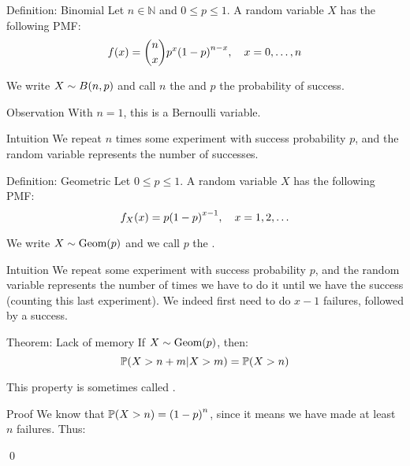 \documentclass[a4paper]{article}
\begin{document}
\begin{parag}{Definition: Binomial}
    Let $n \in \mathbb{N}$ and $0 \leq p \leq 1$. A  random variable $X$ has the following PMF: 
    \[f\left(x\right) = \binom{n}{x} p^x \left(1 - p\right)^{n-x}, \mathspace x = 0, \ldots, n\]
    
    We write $X \followsdistr B\left(n, p\right)$ and call $n$ the  and $p$ the probability of success.

    \begin{subparag}{Observation}
        With $n=1$, this is a Bernoulli variable.
    \end{subparag}

    \begin{subparag}{Intuition}
        We repeat $n$ times some experiment with success probability $p$, and the random variable represents the number of successes.
    \end{subparag}
\end{parag}

\begin{parag}{Definition: Geometric}
    Let $0 \leq p \leq1$. A  random variable $X$ has the following PMF: 
    \[f_X\left(x\right) = p\left(1-p\right)^{x-1}, \mathspace x = 1, 2, \ldots\]
    
    We write $X \followsdistr \text{Geom}\left(p\right)$ and we call $p$ the .

    \begin{subparag}{Intuition}
        We repeat some experiment with success probability $p$, and the random variable represents the number of times we have to do it until we have the success (counting this last experiment). We indeed first need to do $x-1$ failures, followed by a success.
    \end{subparag}
\end{parag}

\begin{parag}{Theorem: Lack of memory}
    If $X \followsdistr \text{Geom}\left(p\right)$, then: 
    \[\prob\left(X > n + m | X > m\right) = \prob\left(X > n\right)\]

    This property is sometimes called .

    \begin{subparag}{Proof}
        We know that $\prob\left(X > n\right) = \left(1 - p\right)^n$, since it means we have made at least $n$ failures. Thus: 

        \qed
    \end{subparag}
\end{parag}
\end{document}
